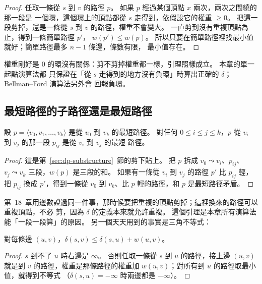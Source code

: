 \begin{proof}
任取一條從 $s$ 到 $v$ 的路徑 $p$。 如果 $p$ 經過某個頂點 $x$ 兩次，兩次之間繞的那一段是
一個環，這個環上的頂點都從 $s$ 走得到，依假設它的權重 $\ge 0$。 把這一段剪掉，還是一條從
$s$ 到 $v$ 的路徑，權重不會變大。 一直剪到沒有重複頂點為止，得到一條簡單路徑 $p'$，
$w(p') \le w(p)$。 所以只要在簡單路徑裡找最小值就好；簡單路徑最多 $n - 1$ 條邊，條數有限，
最小值存在。
\end{proof}

權重剛好是 $0$ 的環沒有關係：剪不剪掉權重都一樣，引理照樣成立。 本章的單一起點演算法都
只保證在「從 $s$ 走得到的地方沒有負環」時算出正確的 $\delta$；Bellman--Ford 演算法另外會
回報負環。

\subsection{最短路徑的子路徑還是最短路徑}

\begin{lemma}
\label{lem:spt-subpath}
設 $p = \langle v_0, v_1, \ldots, v_k \rangle$ 是從 $v_0$ 到 $v_k$ 的最短路徑。 對任何
$0 \le i \le j \le k$，$p$ 從 $v_i$ 到 $v_j$ 的那一段 $p_{ij}$ 是從 $v_i$ 到 $v_j$ 的最短
路徑。
\end{lemma}

\begin{proof}
這是第~\ref{sec:dp-substructure}~節的剪下貼上。 把 $p$ 拆成 $v_0 \leadsto v_i$、$p_{ij}$、$v_j \leadsto
v_k$ 三段，$w(p)$ 是三段的和。 如果有一條從 $v_i$ 到 $v_j$ 的路徑 $p'$ 比 $p_{ij}$ 輕，把
$p_{ij}$ 換成 $p'$，得到一條從 $v_0$ 到 $v_k$、比 $p$ 輕的路徑，和 $p$ 是最短路徑矛盾。
\end{proof}

第~18~章用邊數證過同一件事，那時候要把重複的頂點剪掉；這裡換來的路徑可以重複頂點，不必
剪，因為 $\delta$ 的定義本來就允許重複。 這個引理是本章所有演算法能「一段一段算」的原因。
另一個天天用到的事實是三角不等式：

\begin{lemma}[三角不等式]
\label{lem:spt-triangle}
對每條邊 $(u, v)$，$\delta(s, v) \le \delta(s, u) + w(u, v)$。
\end{lemma}

\begin{proof}
$s$ 到不了 $u$ 時右邊是 $\infty$。 否則任取一條從 $s$ 到 $u$ 的路徑，接上邊 $(u, v)$ 就是到
$v$ 的路徑，權重是那條路徑的權重加 $w(u, v)$；對所有到 $u$ 的路徑取最小值，就得到不等式
（$\delta(s, u) = -\infty$ 時兩邊都是 $-\infty$）。
\end{proof}

